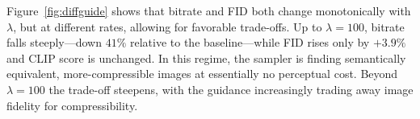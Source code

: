 Figure~\ref{fig:diffguide} shows that bitrate and FID both change monotonically with $\lambda$, but at different rates, allowing for favorable trade-offs.
Up to $\lambda{=}100$, bitrate falls steeply---down $41\%$ relative to the baseline---while FID rises only by $+3.9\%$ and CLIP score is unchanged.
In this regime, the sampler is finding semantically equivalent, more-compressible images at essentially no perceptual cost.
Beyond $\lambda{=}100$ the trade-off steepens, with the guidance increasingly trading away image fidelity for compressibility.